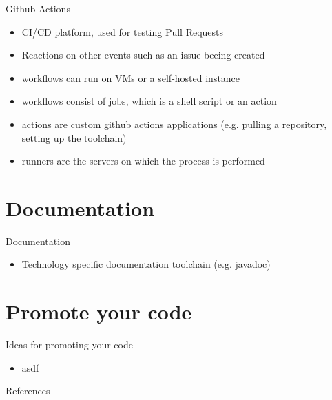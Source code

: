 \documentclass[compress,aspectratio=169]{beamer}
\begin{document}
		\begin{frame}{Github Actions}
			\begin{itemize}
				\item 	CI/CD platform, used for testing Pull Requests
				\item 	Reactions on other events such as an issue beeing created
				\item 	workflows can run on VMs or a self-hosted instance
				\item 	workflows consist of jobs, which is a shell script or an action
				\item 	actions are custom github actions applications (e.g. pulling a repository, setting up the toolchain) 
				\item 	runners are the servers on which the process is performed
			\end{itemize}
		\end{frame}
		
	\section{Documentation}
		\begin{frame}{Documentation}
			\begin{itemize}
				\item 	Technology specific documentation toolchain (e.g. javadoc)
			\end{itemize}
		\end{frame}
	
	\section{Promote your code}
	
		\begin{frame}{Ideas for promoting your code}
		
			\begin{itemize}
				\item asdf
			
			\end{itemize}
			
		\end{frame}
	
		
		\begin{frame}{References}
			\renewcommand*{\bibfont}{\normalfont\scriptsize}
			\printbibliography[heading=none]
			\label{pg:lastpage} %
		\end{frame}
\end{document}
